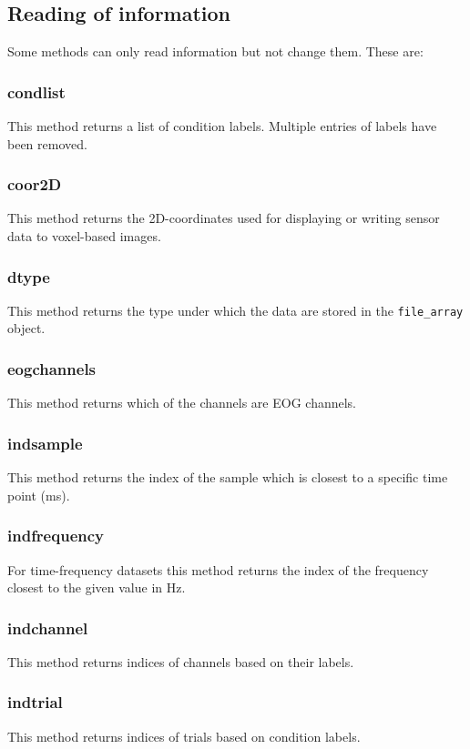 \subsection{Reading of information}
Some methods can only read information but not change them. These are:

\subsubsection{condlist}
This method returns a list of condition labels. Multiple entries of labels have been removed.

\subsubsection{coor2D}
This method returns the 2D-coordinates used for displaying or writing sensor data to voxel-based images.

\subsubsection{dtype}
This method returns the type under which the data are stored in the \texttt{file\_array} object.

\subsubsection{eogchannels}
This method returns which of the channels are EOG channels.

\subsubsection{indsample}
This method returns the index of the sample which is closest to a specific time point (ms).

\subsubsection{indfrequency}
For time-frequency datasets this method returns the index of the frequency closest to the given value in Hz.

\subsubsection{indchannel}
This method returns indices of channels based on their labels.

\subsubsection{indtrial}
This method returns indices of trials based on condition labels.

